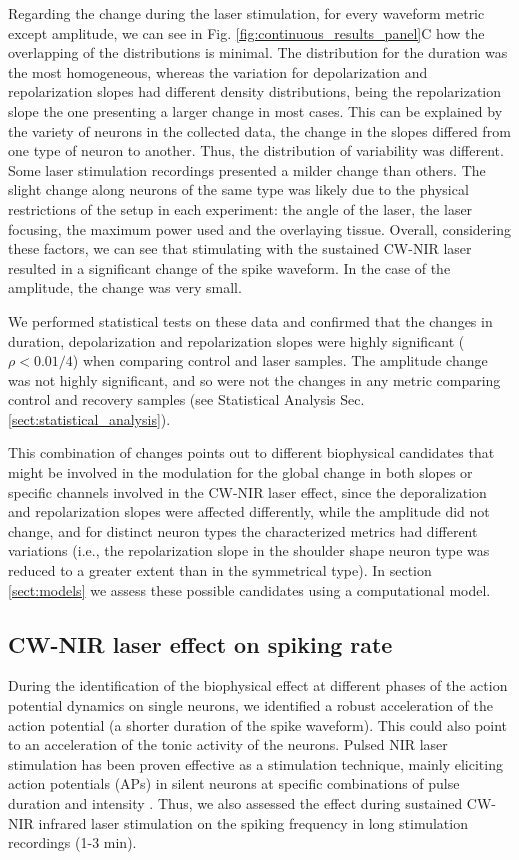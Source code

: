 Regarding the change during the laser stimulation, for every waveform metric except amplitude, we can see in Fig. \ref{fig:continuous_results_panel}C how the overlapping of the distributions is minimal. The distribution for the duration was the most homogeneous, whereas the variation for depolarization and repolarization slopes had different density distributions, being the repolarization slope the one presenting a larger change in most cases. This can be explained by the variety of neurons in the collected data, the change in the slopes differed from one type of neuron to another. Thus, the distribution of variability was different. Some laser stimulation recordings presented a milder change than others. The slight change along neurons of the same type was likely due to the physical restrictions of the setup in each experiment: the angle of the laser, the laser focusing, the maximum power used and the overlaying tissue. Overall, considering these factors, we can see that stimulating with the sustained CW-NIR laser resulted in a significant change of the spike waveform. In the case of the amplitude, the change was very small. 

We performed statistical tests on these data and confirmed that the changes in duration, depolarization and repolarization slopes were highly significant ($\rho < 0.01 /4$) when comparing control and laser samples. The amplitude change was not highly significant, and so were not the changes in any metric comparing control and recovery samples (see Statistical Analysis Sec. \ref{sect:statistical_analysis}).

This combination of changes points out to different biophysical candidates that might be involved in the modulation for the global change in both slopes or specific channels involved in the CW-NIR laser effect, since the deporalization and repolarization slopes were affected differently, while the amplitude did not change, and for distinct neuron types the characterized metrics had different variations (i.e., the repolarization slope in the shoulder shape neuron type was reduced to a greater extent than in the symmetrical type). In section \ref{sect:models} we assess these possible candidates using a computational model. 

\subsection{CW-NIR laser effect on spiking rate}
During the identification of the biophysical effect at different phases of the action potential dynamics on single neurons, we identified a robust acceleration of the action potential (a shorter duration of the spike waveform). This could also point to an acceleration of the tonic activity of the neurons. Pulsed NIR laser stimulation has been proven effective as a stimulation technique, mainly eliciting action potentials (APs) in silent neurons at specific combinations of pulse duration and intensity \parencite{wells_application_2005, shapiro_infrared_2012, izzo_optical_2007, cayce_infrared_2014}. Thus, we also assessed the effect during sustained CW-NIR infrared laser stimulation on the spiking frequency in long stimulation recordings (1-3 min). 

